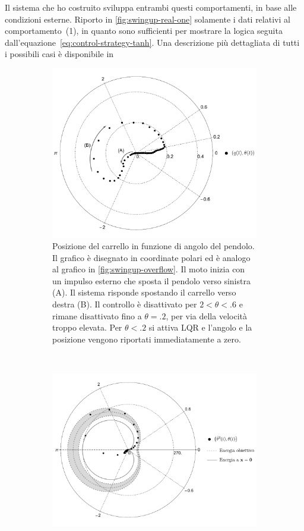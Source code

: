 Il sistema che ho costruito sviluppa entrambi questi comportamenti,
in base alle condizioni esterne\footnotemark .
Riporto in \autoref{fig:swingup-real-one} solamente i dati relativi al comportamento~(1), in quanto sono
sufficienti per mostrare la logica seguita dall'equazione~\eqref{eq:control-strategy-tanh}.
Una descrizione più dettagliata di tutti i possibili casi è disponibile in


\begin{figure}
    \centering
    \begin{subfigure}[]{\textwidth}
        \centering
        \includegraphics[width=.6\textwidth]{assets/polar-swingup-real}
        \caption{Posizione del carrello in funzione di angolo del pendolo.
        Il grafico è disegnato in coordinate polari ed è analogo
        al grafico in \autoref{fig:swingup-overflow}.
        Il moto inizia con un impulso esterno che sposta il pendolo
        verso sinistra (A). Il sistema risponde spostando il carrello verso
        destra (B). Il controllo è disattivato per $2 < \theta < .6$
        e rimane disattivato fino a $\theta = .2$, per via della velocità troppo
        elevata. Per $\theta < .2$ si attiva LQR e l'angolo e la posizione
        vengono riportati immediatamente a zero.
        }
        \label{fig:spazio-fasi-sistema-polare}
    \end{subfigure}
    \\[5ex]
    \begin{subfigure}[]{\textwidth}
        \centering
        \includegraphics[width=.7\textwidth]{assets/polar-swingup-energy}

\end{subfigure}
\end{figure}
